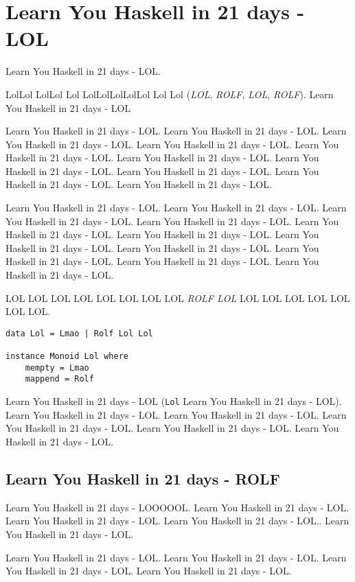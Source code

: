 \section{Learn You Haskell in 21 days - LOL}

Learn You Haskell in 21 days - LOL.

LolLol LolLol Lol LolLolLolLolLol Lol Lol (\emph{LOL}, \emph{ROLF}, \emph{LOL}, \emph{ROLF}). Learn You Haskell in 21 days - LOL

Learn You Haskell in 21 days - LOL. Learn You Haskell in 21 days - LOL. Learn You Haskell in 21 days - LOL. Learn You Haskell in 21 days - LOL. Learn You Haskell in 21 days - LOL. Learn You Haskell in 21 days - LOL. Learn You Haskell in 21 days - LOL. Learn You Haskell in 21 days - LOL. Learn You Haskell in 21 days - LOL. Learn You Haskell in 21 days - LOL.

Learn You Haskell in 21 days - LOL. Learn You Haskell in 21 days - LOL. Learn You Haskell in 21 days - LOL. Learn You Haskell in 21 days - LOL. Learn You Haskell in 21 days - LOL. Learn You Haskell in 21 days - LOL. Learn You Haskell in 21 days - LOL. Learn You Haskell in 21 days - LOL. Learn You Haskell in 21 days - LOL. Learn You Haskell in 21 days - LOL. Learn You Haskell in 21 days - LOL.

LOL LOL LOL LOL LOL LOL LOL LOL \emph{ROLF LOL} LOL LOL LOL LOL LOL LOL LOL.

\begin{verbatim}
data Lol = Lmao | Rolf Lol Lol

instance Monoid Lol where
    mempty = Lmao
    mappend = Rolf

\end{verbatim}

Learn You Haskell in 21 days - LOL (\texttt{Lol} Learn You Haskell in 21 days - LOL). Learn You Haskell in 21 days - LOL. Learn You Haskell in 21 days - LOL. Learn You Haskell in 21 days - LOL. Learn You Haskell in 21 days - LOL. Learn You Haskell in 21 days - LOL.

\subsection{Learn You Haskell in 21 days - ROLF}

Learn You Haskell in 21 days - LOOOOOL. Learn You Haskell in 21 days - LOL. Learn You Haskell in 21 days - LOL. Learn You Haskell in 21 days - LOL.. Learn You Haskell in 21 days - LOL.

Learn You Haskell in 21 days - LOL. Learn You Haskell in 21 days - LOL. Learn You Haskell in 21 days - LOL. Learn You Haskell in 21 days - LOL.